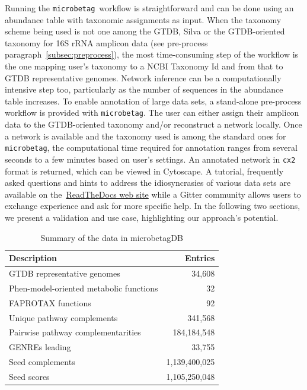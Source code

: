 \documentclass[sn-mathphys,Numbered]{sn-jnl}  %
\theoremstyle{thmstyleone}%
\theoremstyle{thmstyletwo}%
\theoremstyle{thmstylethree}%
\newcommand{\microbetag}{\texttt{microbetag}}
\begin{document}
        Running the \microbetag~\space workflow is straightforward and can be done using an abundance table with taxonomic assignments as input.
        When the taxonomy scheme being used is not one among the GTDB, Silva or the GTDB-oriented taxonomy for 16S rRNA amplicon data (see pre-process paragraph~\ref{subsec:preprocess}), the most time-consuming step of the workflow is the one mapping user's taxonomy to a NCBI Taxonomy Id and from that to GTDB representative genomes. 
        Network inference can be a computationally intensive step too, particularly as the number of sequences in the abundance table increases. 
        To enable annotation of large data sets, a stand-alone pre-process workflow is provided with \microbetag.
        The user can either assign their amplicon data to the GTDB-oriented taxonomy and/or reconstruct a network locally. 
        Once a network is available and the taxonomy used is among the standard ones for \microbetag, the computational time required for annotation ranges from several seconds to a few minutes based on user's settings.
        An annotated network in \texttt{cx2} format is returned, which can be viewed in Cytoscape.
        A tutorial, frequently asked questions and hints to address the idiosyncrasies of various data sets are available on the~\href{https://hariszaf.github.io/microbetag/}{ReadTheDocs web site} while a Gitter community allows users to exchange experience and ask for more specific help.
        In the following two sections, we present a validation and use case, highlighting our approach's potential.

        \begin{table}[h!]
            \caption[Summary of Data]{
                Summary of the data in microbetagDB
            }
            \label{tab:db}
            \begin{tabular}{lr}
                \toprule
                Description & Entries \\
                \midrule
                GTDB representative genomes & 34,608 \\
                Phen-model-oriented metabolic functions & 32 \\
                FAPROTAX functions & 92 \\
                Unique pathway complements & 341,568 \\
                Pairwise pathway complementarities & 184,184,548\\
                GENREs leading  & 33,755 \\
                Seed complements & 1,139,400,025\\
                Seed scores & 1,105,250,048 \\
                \bottomrule
            \end{tabular}
        \end{table}
\end{document}
